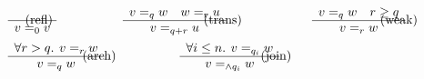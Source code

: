 \begin{figure} [H]
\begin{equation*}
\begin{split}
\begin{aligned}
&
\begin{minipage}[t]{0.3\textwidth}
$\begin{array}{c}
     \\
    \hline
   v=_{0}v
\end{array}
$
\end{minipage}
\hspace{-90pt}
\text{(refl)} 
 \hspace{55pt}
\begin{minipage}[t]{0.3\textwidth}
$\begin{array}{c}
    v=_{q}w \quad w=_{r}u  \\
    \hline
   v=_{q + r} u
\end{array}
$ \end{minipage}
\hspace{-40pt} \text{(trans)} 
\hspace{55pt}
\begin{minipage}[t]{0.3\textwidth}
$\begin{array}{c}
    v=_{q}w \quad r\geq q  \\
    \hline
   v=_{r} w
\end{array}
$ \end{minipage}
\hspace{-50pt} \text{(weak)} \\
&
\begin{minipage}[t]{0.3\textwidth}
$\begin{array}{c}
    \forall r > q . \hspace{4pt} v=_{r} w \\
    \hline
   v=_{q}w
\end{array}
$
\end{minipage}
\hspace{-45pt}
\text{(arch)} 
 \hspace{50pt}
\begin{minipage}[t]{0.3\textwidth}
$\begin{array}{c}
    \forall i \leq n. \hspace{4pt} v=_{q_i} w\\
    \hline
   v=_{\wedge q_i} w
\end{array}
$ \end{minipage}
\hspace{-40pt} \text{(join)} 
\hspace{58pt}

\end{aligned}
\end{split}
\end{equation*}
\end{figure}
